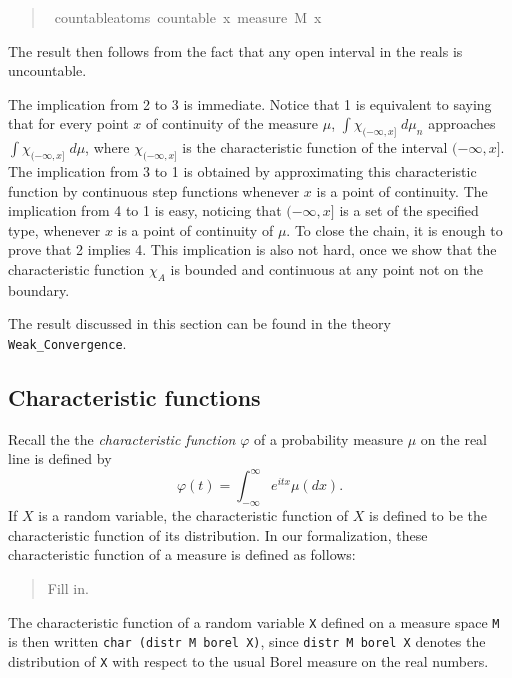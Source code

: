 \documentclass{svjour3}
\newcommand{\todo}[1]{{\color{red}#1}}
\newcommand{\ph}{\varphi}
\begin{document}
\begin{quote}
\begin{isabellebody}
\isamarkupfalse%
\ countable{\isacharunderscore}atoms{\isacharcolon}\ {\isachardoublequoteopen}countable\ {\isacharbraceleft}x{\isachardot}\ measure\ M\ {\isacharbraceleft}x{\isacharbraceright}\ {\isachargreater}\ {}{\isacharbraceright}{\isachardoublequoteclose}
\end{isabellebody}
\end{quote}
The result then follows from the fact that any open interval in the reals is uncountable. 

The implication from 2 to 3 is immediate. Notice that 1 is equivalent to saying that for every point $x$ of continuity of the measure $\mu$, $\int \chi_{(-\infty,x]} \; d\mu_n$ approaches $\int \chi_{(-\infty,x]} \; d\mu$, where $\chi_{(-\infty,x]}$ is the characteristic function of the interval $(-\infty,x]$. The implication from 3 to 1 is obtained by approximating this characteristic function by continuous step functions whenever $x$ is a point of continuity. The implication from 4 to 1 is easy, noticing that $(-\infty,x]$ is a set of the specified type, whenever $x$ is a point of continuity of $\mu$. To close the chain, it is enough to prove that 2 implies 4. This implication is also not hard, once we show that the characteristic function $\chi_A$ is bounded and continuous at any point not on the boundary.

The result discussed in this section can be found in the theory \verb=Weak_Convergence=.

\subsection{Characteristic functions}
\label{subsection:characteristic}

Recall the the \emph{characteristic function} $\ph$ of a probability measure $\mu$ on the real line is defined by
\[
\ph(t) = \int_{-\infty}^{\infty} e^{itx} \mu(dx).
\]
If $X$ is a random variable, the characteristic function of $X$ is defined to be the characteristic function of its distribution.
In our formalization, these characteristic function of a measure is defined as follows:
\begin{quote}
 \todo{Fill in.}
\end{quote}
The characteristic function of a random variable \texttt{X} defined on a measure space \texttt{M} is then written \texttt{char (distr M borel X)}, since \texttt{distr M borel X} denotes the distribution of \texttt{X} with respect to the usual Borel measure on the real numbers.
\end{document}
